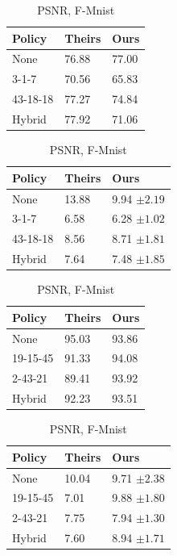 \begin{table}[h]
\begin{subtable}{.50\linewidth}\centering
{\begin{tabular}{|l|l l|}
\hline
      \textbf{Policy} &  \textbf{Theirs} & \textbf{Ours} \\\hline
  None & 76.88 & 77.00     \\
  3-1-7 &  \color{red} 70.56 & \color{red} 65.83    \\
  43-18-18 &  77.27 & 74.84   \\
  Hybrid & \color{red} 77.92 & \color{red} 71.06   \\
  \hline
\end{tabular}}
\caption{Accuracy, Cifar100}\label{tab:1a}
\end{subtable}%
\hfill
\begin{subtable}{.50\linewidth}\centering
{\begin{tabular}{|l|l l |}
\hline
      \textbf{Policy} &  \textbf{Theirs} & \textbf{Ours} \\\hline
  None & \color{red} 13.88 & \color{red} 9.94  $\pm 2.19$ \\
  3-1-7 & 6.58 &  6.28 $\pm 1.02$ \\
  43-18-18 & 8.56 & 8.71 $\pm 1.81 $\\
  Hybrid & 7.64 & 7.48  $\pm 1.85$\\
  \hline
\end{tabular}}
\caption{PSNR, Cifar100}\label{tab:prs}
\end{subtable}%
\hfill
\begin{subtable}{.50\linewidth}\centering
{\begin{tabular}{|l|l l |}
\hline
      \textbf{Policy} &  \textbf{Theirs} & \textbf{Ours} \\\hline
  None &   95.03&    93.86 \\
  19-15-45 &  91.33 &  94.08  \\
  2-43-21  & 89.41 &  93.92 \\
  Hybrid &  92.23 &   93.51\\
  \hline
\end{tabular}}
\caption{Accuracy, F-Mnist}\label{tab:1b}
\end{subtable}
\hfill
\begin{subtable}{.50\linewidth}\centering
{\begin{tabular}{|l|l l|}
\hline
      \textbf{Policy} &  \textbf{Theirs} & \textbf{Ours} \\\hline
  None &  10.04 &   9.71 $\pm 2.38$ \\
  19-15-45 & \color{red} 7.01 & \color{red}  9.88  $\pm 1.80$ \\
  2-43-21 & 7.75 &  7.94 $\pm  1.30$\\
  Hybrid & \color{red} 7.60 &   \color{red} 8.94 $\pm 1.71$\\
  \hline
\end{tabular}}
\caption{PSNR, F-Mnist}\label{tab:psnrs}
\end{subtable}


\end{table}
